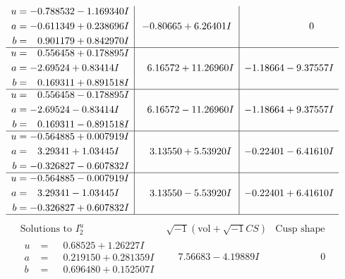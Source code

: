 \documentclass[1p]{elsarticle_modified}
\theoremstyle{definition}
\newcommand{\I}{\sqrt{-1}}
\begin{document}
$$\begin{array}{c|c|c}
\begin{aligned}
u &= -0.788532 - 1.169340 I \\
a &= -0.611349 + 0.238696 I \\
b &= \phantom{-}0.901179 + 0.842970 I\end{aligned}
 & -0.80665 + 6.26401 I & \phantom{-0.000000 } 0 \\ \hline\begin{aligned}
u &= \phantom{-}0.556458 + 0.178895 I \\
a &= -2.69524 + 0.83414 I \\
b &= \phantom{-}0.169311 + 0.891518 I\end{aligned}
 & \phantom{-}6.16572 + 11.26960 I & -1.18664 - 9.37557 I \\ \hline\begin{aligned}
u &= \phantom{-}0.556458 - 0.178895 I \\
a &= -2.69524 - 0.83414 I \\
b &= \phantom{-}0.169311 - 0.891518 I\end{aligned}
 & \phantom{-}6.16572 - 11.26960 I & -1.18664 + 9.37557 I \\ \hline\begin{aligned}
u &= -0.564885 + 0.007919 I \\
a &= \phantom{-}3.29341 + 1.03445 I \\
b &= -0.326827 - 0.607832 I\end{aligned}
 & \phantom{-}3.13550 + 5.53920 I & -0.22401 - 6.41610 I \\ \hline\begin{aligned}
u &= -0.564885 - 0.007919 I \\
a &= \phantom{-}3.29341 - 1.03445 I \\
b &= -0.326827 + 0.607832 I\end{aligned}
 & \phantom{-}3.13550 - 5.53920 I & -0.22401 + 6.41610 I\\
 \hline 
 \end{array}$$\newpage$$\begin{array}{c|c|c}  
\text{Solutions to }I^u_{2}& \I (\text{vol} + \sqrt{-1}CS) & \text{Cusp shape}\\
 \hline 
\begin{aligned}
u &= \phantom{-}0.68525 + 1.26227 I \\
a &= \phantom{-}0.219150 + 0.281359 I \\
b &= \phantom{-}0.696480 + 0.152507 I\end{aligned}
 & \phantom{-}7.56683 - 4.19889 I & \phantom{-0.000000 } 0 \\ \hline\begin{aligned}

\end{aligned}
\end{array}$$
\end{document}
